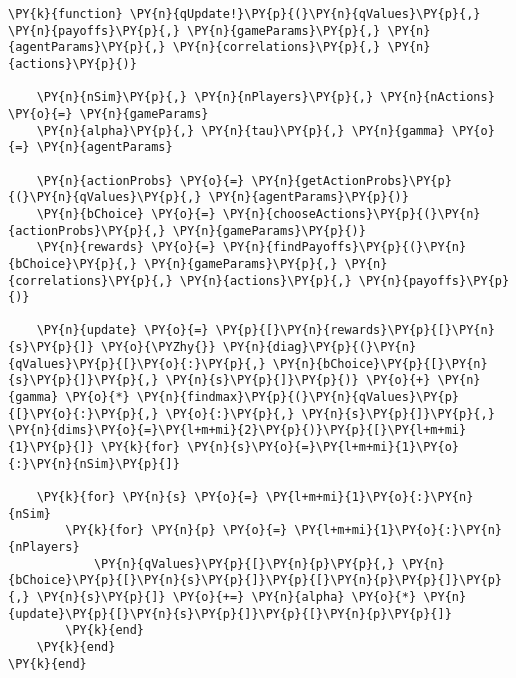 \documentclass[main.tex]{subfiles}
\begin{document}
    \begin{tcolorbox}[breakable, size=fbox, boxrule=1pt, pad at break*=1mm,colback=cellbackground, colframe=cellborder]
\begin{Verbatim}[commandchars=\\\{\}]
\PY{k}{function} \PY{n}{qUpdate!}\PY{p}{(}\PY{n}{qValues}\PY{p}{,} \PY{n}{payoffs}\PY{p}{,} \PY{n}{gameParams}\PY{p}{,} \PY{n}{agentParams}\PY{p}{,} \PY{n}{correlations}\PY{p}{,} \PY{n}{actions}\PY{p}{)}

    \PY{n}{nSim}\PY{p}{,} \PY{n}{nPlayers}\PY{p}{,} \PY{n}{nActions} \PY{o}{=} \PY{n}{gameParams}
    \PY{n}{alpha}\PY{p}{,} \PY{n}{tau}\PY{p}{,} \PY{n}{gamma} \PY{o}{=} \PY{n}{agentParams}
    
    \PY{n}{actionProbs} \PY{o}{=} \PY{n}{getActionProbs}\PY{p}{(}\PY{n}{qValues}\PY{p}{,} \PY{n}{agentParams}\PY{p}{)}
    \PY{n}{bChoice} \PY{o}{=} \PY{n}{chooseActions}\PY{p}{(}\PY{n}{actionProbs}\PY{p}{,} \PY{n}{gameParams}\PY{p}{)}
    \PY{n}{rewards} \PY{o}{=} \PY{n}{findPayoffs}\PY{p}{(}\PY{n}{bChoice}\PY{p}{,} \PY{n}{gameParams}\PY{p}{,} \PY{n}{correlations}\PY{p}{,} \PY{n}{actions}\PY{p}{,} \PY{n}{payoffs}\PY{p}{)}

    \PY{n}{update} \PY{o}{=} \PY{p}{[}\PY{n}{rewards}\PY{p}{[}\PY{n}{s}\PY{p}{]} \PY{o}{\PYZhy{}} \PY{n}{diag}\PY{p}{(}\PY{n}{qValues}\PY{p}{[}\PY{o}{:}\PY{p}{,} \PY{n}{bChoice}\PY{p}{[}\PY{n}{s}\PY{p}{]}\PY{p}{,} \PY{n}{s}\PY{p}{]}\PY{p}{)} \PY{o}{+} \PY{n}{gamma} \PY{o}{*} \PY{n}{findmax}\PY{p}{(}\PY{n}{qValues}\PY{p}{[}\PY{o}{:}\PY{p}{,} \PY{o}{:}\PY{p}{,} \PY{n}{s}\PY{p}{]}\PY{p}{,} \PY{n}{dims}\PY{o}{=}\PY{l+m+mi}{2}\PY{p}{)}\PY{p}{[}\PY{l+m+mi}{1}\PY{p}{]} \PY{k}{for} \PY{n}{s}\PY{o}{=}\PY{l+m+mi}{1}\PY{o}{:}\PY{n}{nSim}\PY{p}{]}
    
    \PY{k}{for} \PY{n}{s} \PY{o}{=} \PY{l+m+mi}{1}\PY{o}{:}\PY{n}{nSim}
        \PY{k}{for} \PY{n}{p} \PY{o}{=} \PY{l+m+mi}{1}\PY{o}{:}\PY{n}{nPlayers}
            \PY{n}{qValues}\PY{p}{[}\PY{n}{p}\PY{p}{,} \PY{n}{bChoice}\PY{p}{[}\PY{n}{s}\PY{p}{]}\PY{p}{[}\PY{n}{p}\PY{p}{]}\PY{p}{,} \PY{n}{s}\PY{p}{]} \PY{o}{+=} \PY{n}{alpha} \PY{o}{*} \PY{n}{update}\PY{p}{[}\PY{n}{s}\PY{p}{]}\PY{p}{[}\PY{n}{p}\PY{p}{]}
        \PY{k}{end}
    \PY{k}{end}
\PY{k}{end}
\end{Verbatim}
\end{tcolorbox}
\end{document}
